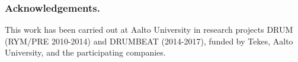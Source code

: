 \documentclass[envcountsame]{llncs}
\begin{document}

\subsubsection{Acknowledgements.} This work has been carried out at Aalto University in research projects DRUM (RYM/PRE 2010-2014) and DRUMBEAT (2014-2017), funded by Tekes, Aalto University, and the participating companies. 

%

% 





\clearpage
{} %
\renewcommand{\indexname}{Author Index}
\printindex
\clearpage
{} %
\renewcommand{\indexname}{Subject Index}
% 
\end{document}

